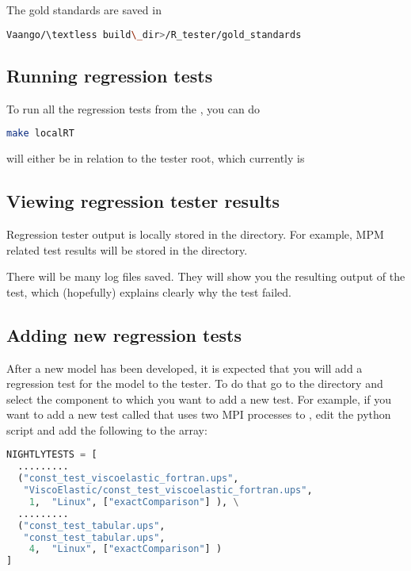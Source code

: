 The gold standards are saved in 
\begin{lstlisting}[language=sh, backgroundcolor=\color{background}]
Vaango/\textless build\_dir>/R_tester/gold_standards
\end{lstlisting}

\subsection{Running regression tests}
To run all the regression tests from the , you can do 
\begin{lstlisting}[language=sh, backgroundcolor=\color{background}]
make localRT
\end{lstlisting}
will either be in relation to the tester root, which currently is 

\subsection{Viewing regression tester results}
Regression tester output is locally stored in the 
directory.  For example, MPM related test results will be stored in the 
 directory.

There will be many log files saved. They will show you the resulting output 
of the test, which (hopefully) explains clearly why the test failed.

\subsection{Adding new regression tests}
After a new model has been developed, it is expected that you will add
a regression test for the model to the tester.  To do that go to the 
 directory and select the component to 
which you want to add a new test.  For example, if you want to add a 
new test called  that uses two MPI processes
to , edit the python script and add the following to 
the  array:
\begin{lstlisting}[language=Python]
NIGHTLYTESTS = [  
  .........
  ("const_test_viscoelastic_fortran.ups", 
   "ViscoElastic/const_test_viscoelastic_fortran.ups",                       
    1,  "Linux", ["exactComparison"] ), \
  .........
  ("const_test_tabular.ups", 
   "const_test_tabular.ups",                       
    4,  "Linux", ["exactComparison"] )
]
\end{lstlisting}

